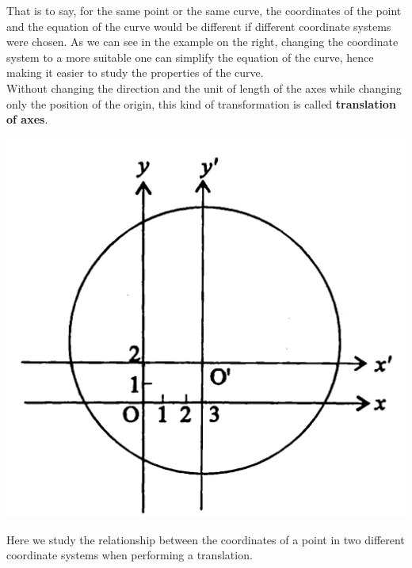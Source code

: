 \documentclass{report}
\begin{document}
\begin{multicols}{2}

    That is to say, for the same point or the same curve, the coordinates of the
    point and the equation of the curve would be different if different coordinate
    systems were chosen. As we can see in the example on the right, changing the
    coordinate system to a more suitable one can simplify the equation of the
    curve, hence making it easier to study the properties of the curve. \\
    \vspace{1em} Without changing the direction and the unit of length of the axes
    while changing only the position of the origin, this kind of transformation is
    called \textbf{translation of axes}.

    \columnbreak{}

    \begin{center}
        \includegraphics[scale=0.3]{./assets/fig1}
    \end{center}
\end{multicols}
\vspace{-1em}
Here we study the relationship between the coordinates of a point in two
different coordinate systems when performing a translation.
\end{document}
